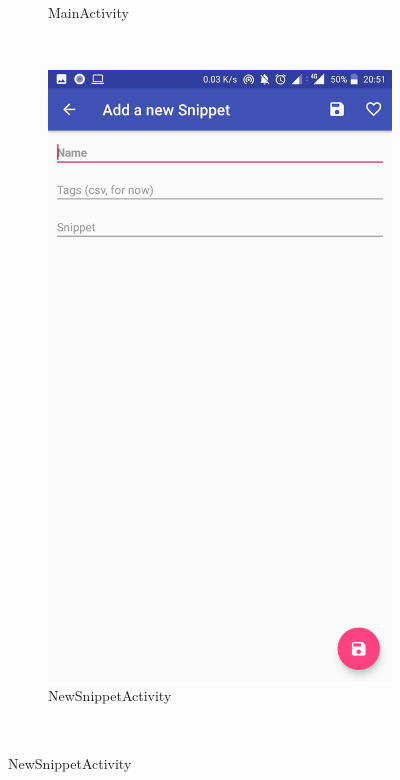 \documentclass[11pt]{article}
\begin{document}
\begin{figure}
\begin{subfigure}[b]{0.3\textwidth}
			\caption{MainActivity}
		\end{subfigure}
		~ %
		\begin{subfigure}[b]{0.3\textwidth}
			\includegraphics[width=\textwidth]{Konzepte/screenshots/add_snippet.jpg}
			\caption{NewSnippetActivity}
		\end{subfigure}
		~ %

\end{figure}
\end{document}
